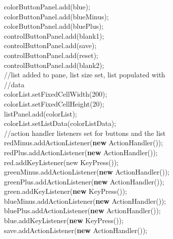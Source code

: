 \documentclass[12pt]{article}
\begin{document}
\begin{flushleft}
{\qquad \qquad \qquad			colorButtonPanel.add(blue);\\        
\qquad \qquad \qquad			colorButtonPanel.add(blueMinus);\\  
\qquad \qquad \qquad			colorButtonPanel.add(bluePlus);\\
\qquad \qquad \qquad			controlButtonPanel.add(blank1);\\
\qquad \qquad \qquad			controlButtonPanel.add(save);\\ 
\qquad \qquad \qquad			controlButtonPanel.add(reset);\\
\qquad \qquad \qquad			controlButtonPanel.add(blank2);\\
			[6mm]
\qquad \qquad \qquad			//list added to pane, list size set, list populated with\\
\qquad \qquad \qquad //data\\
\qquad \qquad \qquad			colorList.setFixedCellWidth(200);\\
\qquad \qquad \qquad			colorList.setFixedCellHeight(20);\\        
\qquad \qquad \qquad			listPanel.add(colorList);\\
\qquad \qquad \qquad			colorList.setListData(colorListData);\\
			[2mm]
\qquad \qquad \qquad			//action handler listeners set for buttons and the list\\
\qquad \qquad \qquad			redMinus.addActionListener(\textbf{new} ActionHandler());\\ 
\qquad \qquad \qquad			redPlus.addActionListener(\textbf{new} ActionHandler());\\
\qquad \qquad \qquad			red.addKeyListener(new KeyPress());\\
\qquad \qquad \qquad			greenMinus.addActionListener(\textbf{new} ActionHandler());\\ 
\qquad \qquad \qquad			greenPlus.addActionListener(\textbf{new} ActionHandler());\\
\qquad \qquad \qquad			green.addKeyListener(\textbf{new} KeyPress());\\
\qquad \qquad \qquad			blueMinus.addActionListener(\textbf{new} ActionHandler());\\ 
\qquad \qquad \qquad			bluePlus.addActionListener(\textbf{new} ActionHandler());\\
\qquad \qquad \qquad			blue.addKeyListener(\textbf{new} KeyPress());\\
\qquad \qquad \qquad			save.addActionListener(\textbf{new} ActionHandler());\\
}
\end{flushleft}
\end{document}
